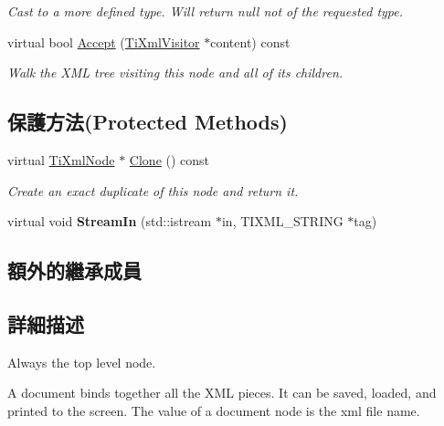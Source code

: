 \begin{DoxyCompactItemize}
\begin{DoxyCompactList}\small\item\em Cast to a more defined type. Will return null not of the requested type. \end{DoxyCompactList}\item 
virtual bool \hyperlink{class_ti_xml_document_a3daab2f472418ef66315750202f762ae}{Accept} (\hyperlink{class_ti_xml_visitor}{Ti\+Xml\+Visitor} $\ast$content) const \hypertarget{class_ti_xml_document_a3daab2f472418ef66315750202f762ae}{}\label{class_ti_xml_document_a3daab2f472418ef66315750202f762ae}

\begin{DoxyCompactList}\small\item\em Walk the X\+ML tree visiting this node and all of its children. \end{DoxyCompactList}\end{DoxyCompactItemize}
\subsection*{保護方法(Protected Methods)}
\begin{DoxyCompactItemize}
\item 
virtual \hyperlink{class_ti_xml_node}{Ti\+Xml\+Node} $\ast$ \hyperlink{class_ti_xml_document_ac9e8f09b23454d953b32d1b65cd1409e}{Clone} () const 
\begin{DoxyCompactList}\small\item\em Create an exact duplicate of this node and return it. \end{DoxyCompactList}\item 
virtual void {\bfseries Stream\+In} (std\+::istream $\ast$in, T\+I\+X\+M\+L\+\_\+\+S\+T\+R\+I\+NG $\ast$tag)\hypertarget{class_ti_xml_document_aceaada9ac29206fb660e0449c92b1295}{}\label{class_ti_xml_document_aceaada9ac29206fb660e0449c92b1295}

\end{DoxyCompactItemize}
\subsection*{額外的繼承成員}


\subsection{詳細描述}
Always the top level node. 

A document binds together all the X\+ML pieces. It can be saved, loaded, and printed to the screen. The \textquotesingle{}value\textquotesingle{} of a document node is the xml file name. 


